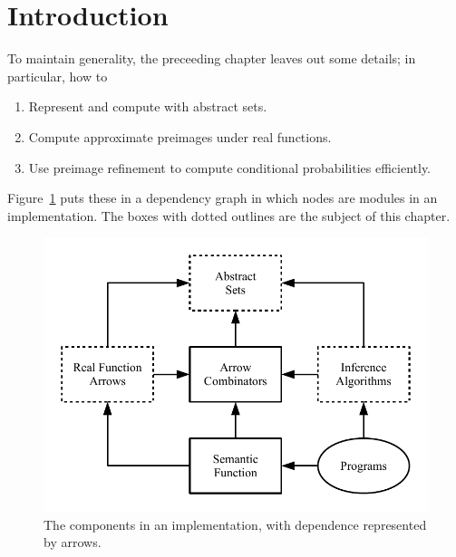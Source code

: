 \DeclarePairedDelimiter{\ivl}{[\mspace{-4.5mu}(}{)\mspace{-4.5mu}]}

\section{Introduction}

To maintain generality, the preceeding chapter leaves out some details; in particular, how to
\begin{enumerate}
	\item Represent and compute with abstract sets.
	\item Compute approximate preimages under real functions.
	\item Use preimage refinement to compute conditional probabilities efficiently.
\end{enumerate}
Figure~\ref{fig:implementation-components} puts these in a dependency graph in which nodes are modules in an implementation.
The boxes with dotted outlines are the subject of this chapter.

\begin{figure}[b!]\centering
\includegraphics[width=4.75in]{figures/implementation-components}
\caption[Implementation dependency graph]{The components in an implementation, with dependence represented by arrows.}
\label{fig:implementation-components}
\end{figure}

